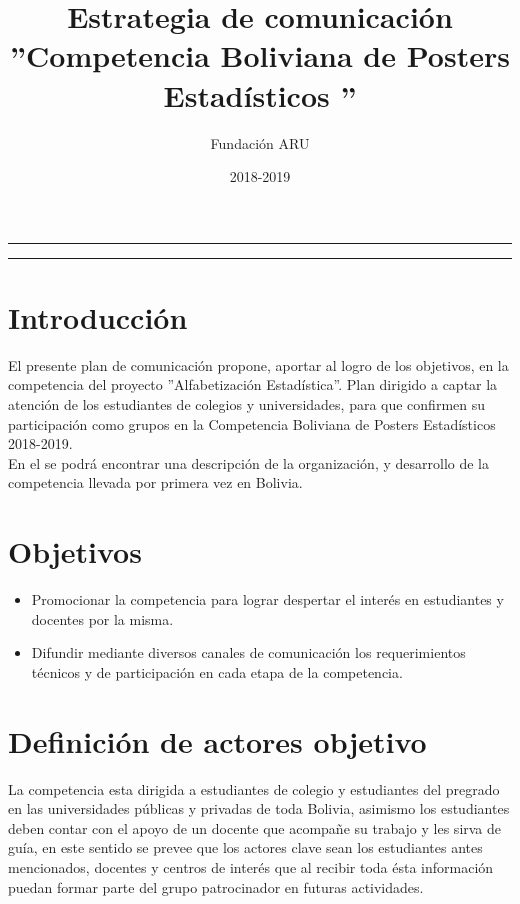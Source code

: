 \documentclass{article}
\title{\textbf{Estrategia de comunicación} \\ ''Competencia Boliviana de Posters Estadísticos ''}
\author{Fundación ARU}
\date{2018-2019 }
\begin{document}
\maketitle

\hrule
\hrule
\newpage

\section{Introducción}

El presente plan de comunicación propone, aportar al logro de los objetivos, en la competencia del proyecto ''Alfabetización Estadística''. Plan dirigido a captar la atención de los estudiantes de colegios y universidades, para que confirmen su participación como grupos en la Competencia Boliviana de Posters Estadísticos 2018-2019.\\

En el se podrá encontrar una descripción de la organización, y desarrollo de la competencia llevada por primera vez en Bolivia.


\section{Objetivos}


\begin{itemize}
\item Promocionar la competencia para lograr despertar el interés en estudiantes y docentes por la misma. 

\item Difundir mediante diversos canales de comunicación los requerimientos técnicos y de participación en cada etapa de la competencia.
\end{itemize} 

\section{Definición de actores objetivo}


La competencia esta dirigida a estudiantes de colegio y estudiantes del pregrado en las universidades públicas y privadas de toda Bolivia, asimismo los estudiantes deben contar con el apoyo de un docente que acompañe su trabajo y les sirva de guía, en este sentido se prevee que los actores clave sean los estudiantes antes mencionados, docentes y centros de interés que al recibir toda ésta información puedan formar parte del grupo patrocinador en futuras actividades.
\end{document}
